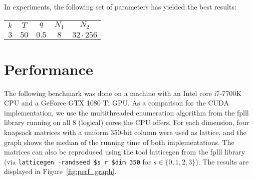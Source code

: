 \documentclass{scrartcl}
\begin{document}
    In experiments, the following set of parameters has yielded the best results:
    
    \begin{center}
        \begin{tabular}[5]{c c c c c}
            $k$ & $T$ & $q$ & $N_1$ & $N_2$ \\
            $3$ & $50$ & $0.5$ & $8$ & $32 \cdot 256$
        \end{tabular}
    \end{center}

    \section{Performance}


    The following benchmark was done on a machine with an Intel core i7-7700K CPU and a GeForce GTX 1080 Ti GPU. As a comparison for the CUDA implementation, we use the multithreaded enumeration algorithm from the fplll library \cite{fplll} running on all 8 (logical) cores the CPU offers.
    For each dimension, four knapsack matrices with a uniform 350-bit column were used as lattice, and the graph shows the median of the running time of both implementations. The matrices can also be reproduced using the tool latticegen from the fplll library (via \texttt{latticegen -randseed \$s r \$dim 350} for $s \in \{0, 1, 2, 3\}$).
    The results are displayed in Figure~\ref{fig:perf_graph}.
\end{document}
